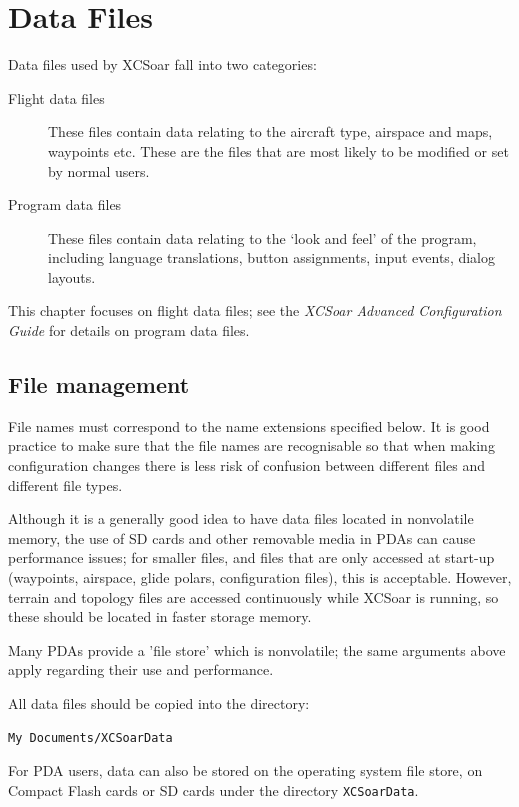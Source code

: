 \documentclass[a4paper,12pt]{refrep}
\begin{document}
\chapter{Data Files}\label{cha:data-files}

Data files used by XCSoar fall into two categories:
\begin{description}
\item[Flight data files]  These files contain data relating to
the aircraft type, airspace and maps, waypoints etc.  These are the
files that are most likely to be modified or set by normal users.
\item[Program data files]  These files contain data relating to
the `look and feel' of the program, including language translations, 
button assignments, input events, dialog layouts.
\end{description}
This chapter focuses on flight data files; see the {\em XCSoar
Advanced Configuration Guide} for details on program data files.

\section{File management}

File names must correspond to the name extensions specified below.  It
is good practice to make sure that the file names are recognisable so
that when making configuration changes there is less risk of confusion
between different files and different file types.

Although it is a generally good idea to have data files located in
nonvolatile memory, the use of SD cards and other removable media in
PDAs can cause performance issues; for smaller files, and files that
are only accessed at start-up (waypoints, airspace, glide polars,
configuration files), this is acceptable.  However, terrain and
topology files are accessed continuously while XCSoar is running, so
these should be located in faster storage memory.

Many PDAs provide a 'file store' which is nonvolatile; the same
arguments above apply regarding their use and performance.

All data files should be copied into the directory:
\begin{verbatim}
My Documents/XCSoarData
\end{verbatim}

For PDA users, data can also be stored on the operating system file
store, on Compact Flash cards or SD cards under the directory
\verb|XCSoarData|.
\end{document}
